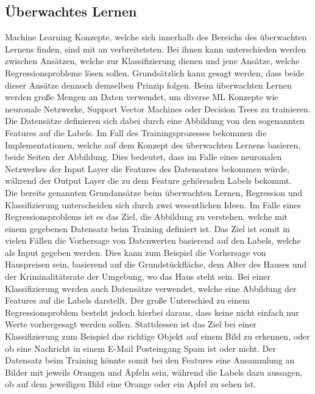 \documentclass[]{iat}
\begin{document}
\subsection{Überwachtes Lernen} \label{sec:ueberwachtes_lernen}
Machine Learning Konzepte, welche sich innerhalb des Bereichs des überwachten Lernens finden, sind mit an verbreitetsten. Bei ihnen kann unterschieden werden zwischen Ansätzen, welche zur Klassifizierung dienen und jene Ansätze, welche Regressionsprobleme lösen sollen. Grundsätzlich kann gesagt werden, dass beide dieser Ansätze dennoch demselben Prinzip folgen. Beim überwachten Lernen werden große Mengen an Daten verwendet, um diverse ML Konzepte wie neuronale Netzwerke, Support Vector Machines oder Decision Trees zu trainieren. Die Datensätze definieren sich dabei durch eine Abbildung von den sogenannten Features auf die Labels. Im Fall des Trainingsprozesses bekommen die Implementationen, welche auf dem Konzept des überwachten Lernens basieren, beide Seiten der Abbildung. Dies bedeutet, dass im Falle eines neuronalen Netzwerkes der Input Layer die Features des Datensatzes bekommen würde, während der Output Layer die zu dem Feature gehörenden Labels bekommt.\\
Die bereits genannten Grundansätze beim überwachten Lernen, Regression und Klassifizierung unterscheiden sich durch zwei wesentlichen Ideen. Im Falle eines Regressionsproblems ist es das Ziel, die Abbildung zu verstehen, welche mit einem gegebenen Datensatz beim Training definiert ist. Das Ziel ist somit in vielen Fällen die Vorhersage von Datenwerten basierend auf den Labels, welche als Input gegeben werden. Dies kann zum Beispiel die Vorhersage von Hauspreisen sein, basierend auf die Grundstückfläche, dem Alter des Hauses und der Kriminalitätsrate der Umgebung, wo das Haus steht sein. Bei einer Klassifizierung werden auch Datensätze verwendet, welche eine Abbildung der Features auf die Labels darstellt. Der große Unterschied zu einem Regressionsproblem besteht jedoch hierbei daraus, dass keine nicht einfach nur Werte vorhergesagt werden sollen. Stattdessen ist das Ziel bei einer Klassifizierung zum Beispiel das richtige Objekt auf einem Bild zu erkennen, oder ob eine Nachricht in einem E-Mail Posteingang Spam ist oder nicht. Der Datensatz beim Training könnte somit bei den Features eine Ansammlung an Bilder mit jeweils Orangen und Äpfeln sein, während die Labels dazu aussagen, ob auf dem jeweiligen Bild eine Orange oder ein Apfel zu sehen ist.
\end{document}
